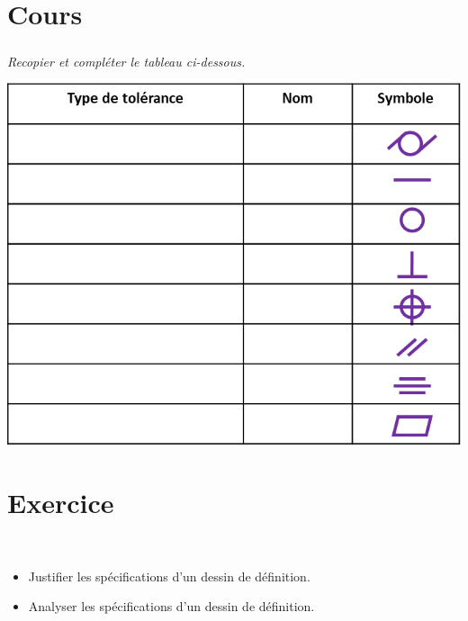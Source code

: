 \documentclass[10pt,fleqn]{article} %
\begin{document}

\vspace{5.5cm}
\pagestyle{fancy}
\thispagestyle{plain}


\def\columnseprulecolor{\color{ocre}}
\setlength{\columnseprule}{0.4pt} 


\begin{multicols}{2}
\section*{Cours}

\subparagraph{}\textit{Recopier et compléter le tableau ci-dessous.}

\begin{center}
\includegraphics[width=.8\linewidth]{images/cours_01}
\end{center}


\section*{Exercice}

\begin{obj}~\\
\begin{itemize}
\item Justifier les spécifications d'un dessin de définition.
\item Analyser les spécifications d'un dessin de définition.
\end{itemize}
\end{obj}



\end{multicols}
\end{document}
